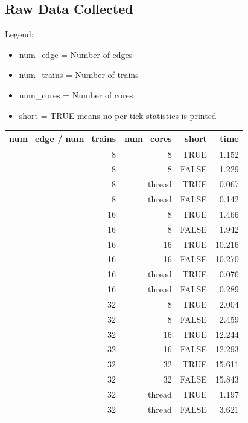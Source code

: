 \documentclass[a4paper,12pt]{article}
\begin{document}
\subsection{Raw Data Collected}
Legend:
\begin{itemize}
	\item num\_edge = Number of edges
	\item num\_trains = Number of trains
	\item num\_cores = Number of cores
	\item short = TRUE means no per-tick statistics is printed
\end{itemize}
\begin{center}
	\begin{tabular}{r r r | r}
		num\_edge / num\_trains & num\_cores & short & time    \\
		\hline
		8                       & 8          & TRUE  & 1.152   \\
		8                       & 8          & FALSE & 1.229   \\
		8                       & thread     & TRUE  & 0.067   \\
		8                       & thread     & FALSE & 0.142   \\
		\hline
		16                      & 8          & TRUE  & 1.466   \\
		16                      & 8          & FALSE & 1.942   \\
		16                      & 16         & TRUE  & 10.216  \\
		16                      & 16         & FALSE & 10.270  \\
		16                      & thread     & TRUE  & 0.076   \\
		16                      & thread     & FALSE & 0.289   \\
		\hline
		32                      & 8          & TRUE  & 2.004   \\
		32                      & 8          & FALSE & 2.459   \\
		32                      & 16         & TRUE  & 12.244  \\
		32                      & 16         & FALSE & 12.293  \\
		32                      & 32         & TRUE  & 15.611  \\
		32                      & 32         & FALSE & 15.843  \\
		32                      & thread     & TRUE  & 1.197   \\
		32                      & thread     & FALSE & 3.621   \\

\end{tabular}
\end{center}
\end{document}
